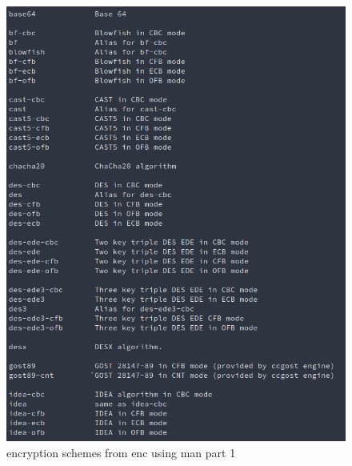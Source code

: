 \documentclass[12pt]{article}
\begin{document}
\begin{figure}[H]
    \begin{center}
        \includegraphics[scale=0.48]{t2p1.png}
    \end{center}{}
    \caption{encryption schemes from enc using man part 1}
    \label{fig:t2p1}
\end{figure}
\end{document}
